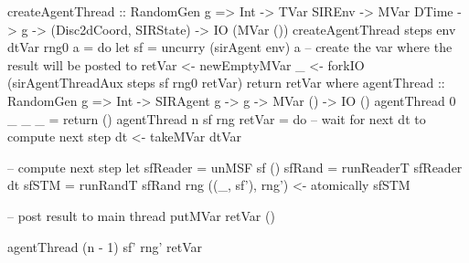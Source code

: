 \begin{HaskellCode}
createAgentThread :: RandomGen g 
                  => Int 
                  -> TVar SIREnv
                  -> MVar DTime
                  -> g
                  -> (Disc2dCoord, SIRState)
                  -> IO (MVar ())
createAgentThread steps env dtVar rng0 a = do
    let sf = uncurry (sirAgent env) a
    -- create the var where the result will be posted to
    retVar <- newEmptyMVar
    _ <- forkIO (sirAgentThreadAux steps sf rng0 retVar)
    return retVar
  where
    agentThread :: RandomGen g 
                => Int
                -> SIRAgent g
                -> g
                -> MVar ()
                -> IO ()
    agentThread 0 _ _ _ = return ()
    agentThread n sf rng retVar = do
      -- wait for next dt to compute next step
      dt <- takeMVar dtVar

      -- compute next step
      let sfReader = unMSF sf ()
          sfRand   = runReaderT sfReader dt
          sfSTM    = runRandT sfRand rng
      ((_, sf'), rng') <- atomically sfSTM 
      
      -- post result to main thread
      putMVar retVar ()
      
      agentThread (n - 1) sf' rng' retVar
\end{HaskellCode}